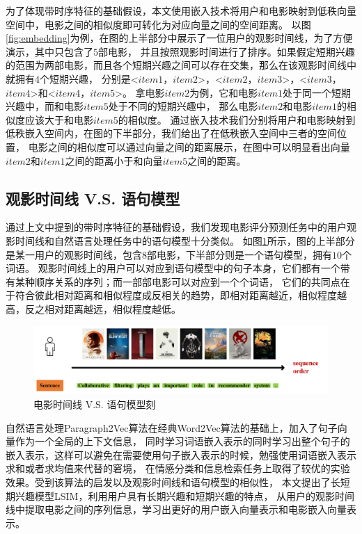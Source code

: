 为了体现带时序特征的基础假设，本文使用嵌入技术将用户和电影映射到低秩向量空间中，电影之间的相似度即可转化为对应向量之间的空间距离。
以图\ref{fig:embedding}为例，在图的上半部分中展示了一位用户的观影时间线，为了方便演示，其中只包含了$5$部电影，
并且按照观影时间进行了排序。如果假定短期兴趣的范围为两部电影，而且各个短期兴趣之间可以存在交集，那么在该观影时间线中就拥有$4$个短期兴趣，
分别是<$item1$，$item2$>，<$item2$，$item3$>，<$item3$，$item4$>和<$item4$，$item5$>。
拿电影$item2$为例，它和电影$item1$处于同一个短期兴趣中，而和电影$item5$处于不同的短期兴趣中，
那么电影$item2$和电影$item1$的相似度应该大于和电影$item5$的相似度。
通过嵌入技术我们分别将用户和电影映射到低秩嵌入空间内，在图的下半部分，我们给出了在低秩嵌入空间中三者的空间位置，
电影之间的相似度可以通过向量之间的距离展示，在图中可以明显看出向量$item2$和$item1$之间的距离小于和向量$item5$之间的距离。

\subsection{观影时间线 V.S. 语句模型}
通过上文中提到的带时序特征的基础假设，我们发现电影评分预测任务中的用户观影时间线和自然语言处理任务中的语句模型十分类似。
如图\ref{fig:example2}所示，图的上半部分是某一用户的观影时间线，包含$8$部电影，下半部分则是一个语句模型，拥有$10$个词语。
观影时间线上的用户可以对应到语句模型中的句子本身，它们都有一个带有某种顺序关系的序列；而一部部电影可以对应到一个个词语，
它们的共同点在于符合彼此相对距离和相似程度成反相关的趋势，即相对距离越近，相似程度越高，反之相对距离越远，相似程度越低。

\begin{figure}[htbp]
\centering
\includegraphics[scale=0.33]{images/example2.pdf}
\caption{电影时间线 V.S. 语句模型刻}
\label{fig:example2}
\end{figure}

自然语言处理Paragraph2Vec算法\parencite{le2014distributed}在经典Word2Vec算法的基础上，加入了句子向量作为一个全局的上下文信息，
同时学习词语嵌入表示的同时学习出整个句子的嵌入表示，这样可以避免在需要使用句子嵌入表示的时候，勉强使用词语嵌入表示求和或者求均值来代替的窘境，
在情感分类和信息检索任务上取得了较优的实验效果。受到该算法的启发以及观影时间线和语句模型的相似性，
本文提出了长短期兴趣模型LSIM，利用用户具有长期兴趣和短期兴趣的特点，
从用户的观影时间线中提取电影之间的序列信息，学习出更好的用户嵌入向量表示和电影嵌入向量表示。

